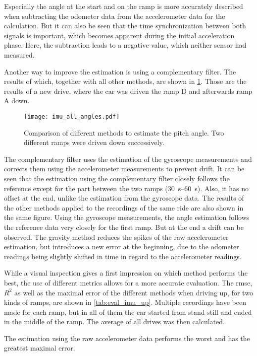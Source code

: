 Especially the angle at the start and on the ramp is more accurately described when subtracting the odometer data from the accelerometer data for the calculation.
But it can also be seen that the time synchronization between both signals is important, which becomes apparent during the initial acceleration phase.
Here, the subtraction leads to a negative value, which neither sensor had measured.\par
Another way to improve the estimation is using a complementary filter.
The results of which, together with all other methods, are shown in \cref{fig:imu_all_angles}.
Those are the results of a new drive, where the car was driven the ramp D and afterwards ramp A down.
\begin{figure}[htb]
	\centering
	\texttt{[image: imu\_all\_angles.pdf]}
	\caption[Angle estimation comparison of all methods]{Comparison of different methods to estimate the pitch angle. Two different ramps were driven down successively.}
	\label{fig:imu_all_angles}
\end{figure}
The complementary filter uses the estimation of the gyroscope measurements and corrects them using the accelerometer measurements to prevent drift.
It can be seen that the estimation using the complementary filter closely follows the reference except for the part between the two ramps (\SIrange{30}{60}{\second}).
Also, it has no offset at the end, unlike the estimation from the gyroscope data.
The results of the other methods applied to the recordings of the same ride are also shown in the same figure.
Using the gyroscope measurements, the angle estimation follows the reference data very closely for the first ramp.
But at the end a drift can be observed.
The gravity method reduces the spikes of the raw accelerometer estimation, but introduces a new error at the beginning, due to the odometer readings being slightly shifted in time in regard to the accelerometer readings.\par
While a visual inspection gives a first impression on which method performs the best, the use of different metrics allows for a more accurate evaluation.
The \gls{rmse}, $R^2$ as well as the maximal error of the different methods when driving up, for two kinds of ramps, are shown in \cref{tab:eval_imu_up}.
Multiple recordings have been made for each ramp, but in all of them the car started from stand still and ended in the middle of the ramp.
The average of all drives was then calculated.\par
The estimation using the raw accelerometer data performs the worst and has the greatest maximal error.
